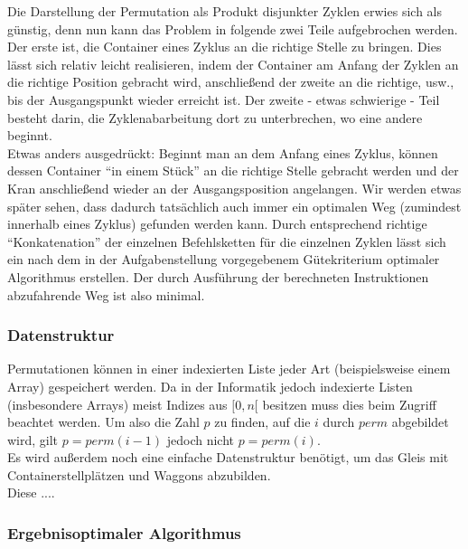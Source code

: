 Die Darstellung der Permutation als Produkt disjunkter Zyklen erwies sich als günstig,
denn nun kann das Problem in folgende zwei Teile aufgebrochen werden.
Der erste ist, die Container eines Zyklus an die richtige Stelle zu bringen.
Dies lässt sich relativ leicht realisieren, indem der Container am Anfang der Zyklen an die richtige Position gebracht wird,
anschließend der zweite an die richtige, usw., bis der Ausgangspunkt wieder erreicht ist.
Der zweite - etwas schwierige - Teil besteht darin, die Zyklenabarbeitung dort zu unterbrechen, wo eine andere beginnt. \\
Etwas anders ausgedrückt:
Beginnt man an dem Anfang eines Zyklus, können dessen Container ``in einem Stück'' an die richtige Stelle gebracht werden und der Kran anschließend wieder an der Ausgangsposition angelangen.
Wir werden etwas später sehen, dass dadurch tatsächlich auch immer ein optimalen Weg (zumindest innerhalb eines Zyklus) gefunden werden kann.
Durch entsprechend richtige ``Konkatenation'' der einzelnen Befehlsketten für die einzelnen Zyklen lässt sich ein nach dem in der Aufgabenstellung vorgegebenem Gütekriterium optimaler Algorithmus erstellen.
Der durch Ausführung der berechneten Instruktionen abzufahrende Weg ist also minimal.
\subsubsection{Datenstruktur}
Permutationen können in einer indexierten Liste jeder Art (beispielsweise einem Array) gespeichert werden.
Da in der Informatik jedoch indexierte Listen (insbesondere Arrays) meist Indizes aus $[0,n[$ besitzen muss dies beim Zugriff beachtet werden.
Um also die Zahl $p$ zu finden, auf die $i$ durch $perm$ abgebildet wird, gilt $p = perm(i-1)$ jedoch nicht $p = perm(i)$. \\
Es wird außerdem noch eine einfache Datenstruktur benötigt, um das Gleis mit Containerstellplätzen und Waggons abzubilden. \\
Diese ....
\subsubsection{Ergebnisoptimaler Algorithmus}
